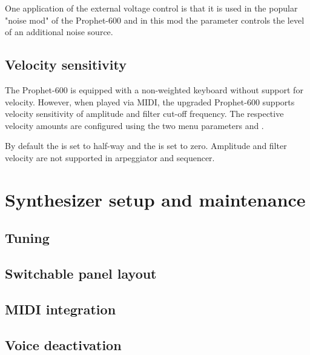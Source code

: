 \documentclass[landscape, 11pt, oneside, twoside]{report}
\newenvironment{flowtext}{\addmargin[0cm]{0cm}}{\endaddmargin} %
\begin{document}
\begin{flowtext}
One application of the external voltage control is that it is used in the popular "noise mod" of the Prophet-600 and in this mod the parameter controls the level of an additional noise source. 

\section{Velocity sensitivity}\label{velocity}

The Prophet-600 is equipped with a non-weighted keyboard without support for velocity. However, when played via MIDI, the upgraded Prophet-600 supports velocity sensitivity of amplitude and filter cut-off frequency. The respective velocity amounts are configured using the two menu parameters \ampvel and \filvel.

By default the \ampvel is set to half-way and the \filvel is set to zero. Amplitude and filter velocity are not supported in arpeggiator and sequencer.

\pagebreak


\chapter{Synthesizer setup and maintenance}\label{maintenance}

\section{Tuning}\label{tuning}



\section{Switchable panel layout}\label{panelswitch}



\section{MIDI integration}\label{midiintegration}



\section{Voice deactivation}\label{voices}


\end{flowtext}
\end{document}
